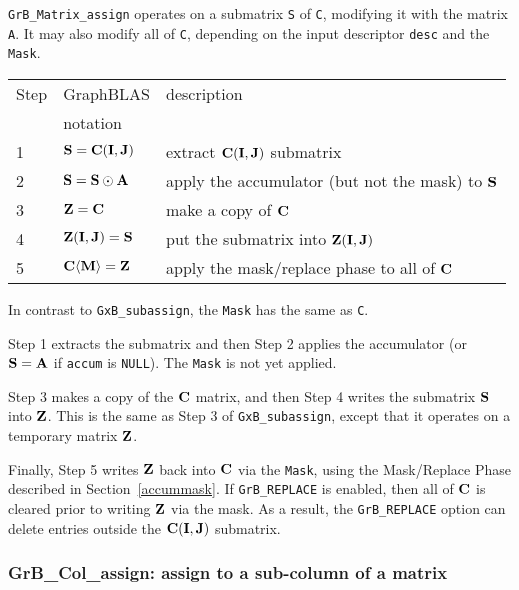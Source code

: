 \documentclass[12pt]{article}
\begin{document}
\verb'GrB_Matrix_assign' operates on a submatrix \verb'S' of \verb'C',
modifying it with the matrix \verb'A'.  It may also modify all of \verb'C',
depending on the input descriptor \verb'desc' and the \verb'Mask'.

\vspace{0.1in}
\begin{tabular}{lll}
\hline
Step & GraphBLAS & description \\
     & notation  & \\
\hline
1 & ${\bf S} = {\bf C(I,J)}$                & extract ${\bf C(I,J)}$ submatrix \\
2 & ${\bf S} = {\bf S} \odot {\bf A}$       & apply the accumulator (but not the mask) to ${\bf S}$\\
3 & ${\bf Z} = {\bf C}$                     & make a copy of ${\bf C}$ \\
4 & ${\bf Z(I,J)} = {\bf S}$                & put the submatrix into ${\bf Z(I,J)}$ \\
5 & ${\bf C \langle M \rangle = Z}$         & apply the mask/replace phase to all of ${\bf C}$ \\
\hline
\end{tabular}
\vspace{0.1in}

In contrast to \verb'GxB_subassign', the \verb'Mask' has the same as \verb'C'.

Step 1 extracts the submatrix and then Step 2 applies the accumulator
(or ${\bf S}={\bf A}$ if \verb'accum' is \verb'NULL').  The \verb'Mask' is
not yet applied.

Step 3 makes a copy of the ${\bf C}$ matrix, and then Step 4 writes the
submatrix ${\bf S}$ into ${\bf Z}$.  This is the same as Step 3 of
\verb'GxB_subassign', except that it operates on a temporary matrix ${\bf Z}$.

Finally, Step 5 writes ${\bf Z}$ back into ${\bf C}$ via the \verb'Mask', using
the Mask/Replace Phase described in Section~\ref{accummask}.  If
\verb'GrB_REPLACE' is enabled, then all of ${\bf C}$ is cleared prior to
writing ${\bf Z}$ via the mask.  As a result, the \verb'GrB_REPLACE' option can
delete entries outside the ${\bf C(I,J)}$ submatrix.

\subsubsection{{\sf GrB\_Col\_assign:} assign to a sub-column of a matrix}
\label{assign_column}
\end{document}
